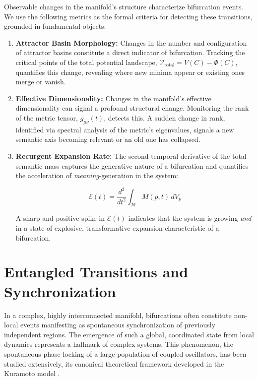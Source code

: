 Observable changes in the manifold's structure characterize bifurcation events. We use the following metrics as the formal criteria for detecting these transitions, grounded in fundamental objects:

\begin{enumerate}

    \item \textbf{Attractor Basin Morphology:} Changes in the number and configuration of attractor basins constitute a direct indicator of bifurcation. Tracking the critical points of the total potential landscape, \(\mathcal{V}_{\text{total}} = V(C) - \Phi(C)\), quantifies this change, revealing where new minima appear or existing ones merge or vanish.
    
    \item \textbf{Effective Dimensionality:} Changes in the manifold's effective dimensionality can signal a profound structural change. Monitoring the rank of the metric tensor, \(g_{\mu\nu}(t)\), detects this. A sudden change in rank, identified via spectral analysis of the metric's eigenvalues, signals a new semantic axis becoming relevant or an old one has collapsed.
    
    \item \textbf{Recurgent Expansion Rate:} The second temporal derivative of the total semantic mass captures the generative nature of a bifurcation and quantifies the acceleration of \textit{meaning}-generation in the system:

    \begin{equation}
    \mathcal{E}(t) = \frac{d^2}{dt^2}\int_{\mathcal{M}} M(p,t) \, dV_p
    \end{equation} 
    
    A sharp and positive spike in \(\mathcal{E}(t)\) indicates that the system is growing \textit{and} in a state of explosive, transformative expansion characteristic of a bifurcation.
    
\end{enumerate}


\section{Entangled Transitions and Synchronization}
\label{11.4:entangled_transitions_and_synchronization}

In a complex, highly interconnected manifold, bifurcations often constitute non-local events manifesting as spontaneous synchronization of previously independent regions. The emergence of such a global, coordinated state from local dynamics represents a hallmark of complex systems. This phenomenon, the spontaneous phase-locking of a large population of coupled oscillators, has been studied extensively, its canonical theoretical framework developed in the Kuramoto model \autocite{Kuramoto1975}.

